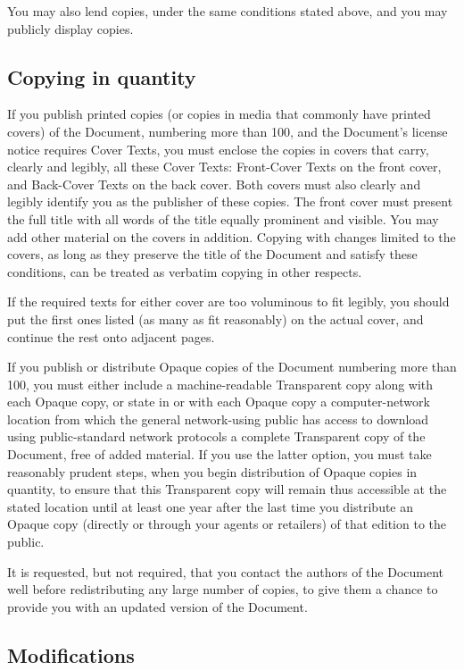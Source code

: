 You may also lend copies, under the same conditions stated above,
and you may publicly display copies.


\subsection{Copying in quantity\label{sub:3Copying-in-quantity}}

If you publish printed copies (or copies in media that commonly have
printed covers) of the Document, numbering more than 100, and the
Document's license notice requires Cover Texts, you must enclose the
copies in covers that carry, clearly and legibly, all these Cover
Texts: Front-Cover Texts on the front cover, and Back-Cover Texts
on the back cover. Both covers must also clearly and legibly identify
you as the publisher of these copies. The front cover must present
the full title with all words of the title equally prominent and visible.
You may add other material on the covers in addition. Copying with
changes limited to the covers, as long as they preserve the title
of the Document and satisfy these conditions, can be treated as verbatim
copying in other respects.

If the required texts for either cover are too voluminous to fit legibly,
you should put the first ones listed (as many as fit reasonably) on
the actual cover, and continue the rest onto adjacent pages.

If you publish or distribute Opaque copies of the Document numbering
more than 100, you must either include a mach\-ine-read\-able Transparent
copy along with each Opaque copy, or state in or with each Opaque
copy a com\-put\-er-net\-work location from which the general net\-work-using
public has access to download using public-standard network protocols
a complete Transparent copy of the Document, free of added material.
If you use the latter option, you must take reasonably prudent steps,
when you begin distribution of Opaque copies in quantity, to ensure
that this Transparent copy will remain thus accessible at the stated
location until at least one year after the last time you distribute
an Opaque copy (directly or through your agents or retailers) of that
edition to the public.

It is requested, but not required, that you contact the authors of
the Document well before redistributing any large number of copies,
to give them a chance to provide you with an updated version of the
Document.


\subsection{Modifications\label{sub:4Modifications}}

